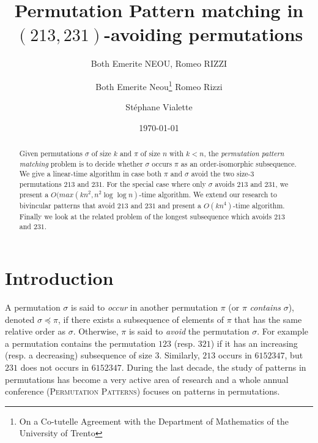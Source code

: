 \documentclass[a4paper]{llncs}
\begin{document}

\title{Permutation Pattern matching in\\ $(213,231)$-avoiding permutations}
\author{Both Emerite NEOU, Romeo RIZZI}
\date{}

\author{%
	Both Emerite Neou\thanks{On a Co-tutelle  Agreement with the Department of Mathematics of the University of Trento}
  Romeo Rizzi \and
  St\'ephane Vialette
}%

\date{\today}

\maketitle

\begin{abstract}
Given permutations $\sigma$ of size $k$ and $\pi$ of size $n$ with $k<n$, the
\emph{permutation pattern matching} problem is to decide whether $\sigma$ occurs
$\pi$ as an order-isomorphic subsequence.
We give a linear-time algorithm in case both $\pi$ and $\sigma$ avoid
the two size-$3$ permutations $213$ and $231$.
For the special case where only $\sigma$ avoids $213$ and $231$, we present a
$O(max(kn^2,n^2\log \log n)$-time algorithm.
We extend our research to bivincular patterns that avoid $213$ and $231$ and present a $O(kn^4)$-time algorithm.
Finally we look at the related problem of the longest subsequence which avoids $213$ and $231$.
\end{abstract}



\section{Introduction}
\label{section:Introduction}



A permutation $\sigma$ is said to \emph{occur} in another permutation $\pi$
(or $\pi$ \emph{contains} $\sigma$),
denoted $\sigma \preceq \pi$,
if there exists a subsequence of elements of $\pi$ that has the same relative
order as $\sigma$.
Otherwise, $\pi$ is said to \emph{avoid} the permutation $\sigma$.
For example a permutation contains the permutation $123$ (resp. $321$) if
it has an increasing (resp. a decreasing) subsequence of size $3$.
Similarly, $213$ occurs in $6152347$, but $231$ does not occurs in $6152347$.
During the last decade, the study of patterns in permutations has
become a very active area of research \cite{Kitaev:book:2011} and
a whole annual conference (\textsc{Permutation Patterns}) focuses
on patterns in permutations.
\end{document}
